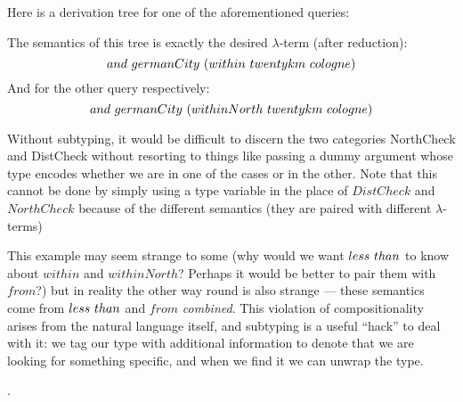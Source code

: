 \documentclass[main.tex]{subfiles}
\begin{document}
\begin{example}
    Here is a derivation tree for one of the aforementioned queries:

    The semantics of this tree is exactly the desired $\lambda$-term (after reduction):
    \[ and \text{ } germanCity \text{ } (within \text{ } twentykm \text{ } cologne) \]
    And for the other query respectively:
    \[ and \text{ } germanCity \text{ } (withinNorth \text{ } twentykm \text{ } cologne) \]

    Without subtyping, it would be difficult to discern the two categories
    NorthCheck and DistCheck without resorting to things like passing a
    dummy argument whose type encodes whether we are in one of the cases or in the other.
    Note that this cannot be done by simply using a type variable in the place
    of $DistCheck$ and $NorthCheck$ because of the different semantics
    (they are paired with different $\lambda$-terms)

    This example may seem strange to some (why would
    we want $less \text{ } than$ to know about $within$ and $withinNorth$?
    Perhaps it would be better to pair them with $from$?) but in reality the
    other way round is also strange --- these semantics come from $less \text{ } than$
    and $from$ \emph{combined}. This violation of compositionality arises
    from the natural language itself, and subtyping is a useful ``hack'' to
    deal with it: we tag our type with additional information to denote that
    we are looking for something specific, and when we find it we can unwrap the
    type.
  \end{example}
  .
\end{document}
